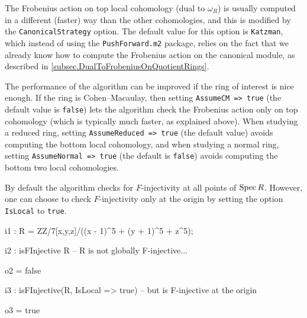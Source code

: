 \documentclass{amsart}
\begin{document}
The Frobenius action on top local cohomology (dual to $\omega_R$) is usually computed in a different (faster) way than the other cohomologies, and this is modified by the \texttt{CanonicalStrategy} option.
The default value for this option is \texttt{Katzman}, which instead of using the \texttt{PushForward.m2} package, relies on the fact that we already know how to compute the Frobenius action on the canonical module, as described in \autoref{subsec.DualToFrobeniusOnQuotientRings}.



The performance of the algorithm can be improved if the ring of interest is
nice enough. If the ring is Cohen--Macaulay, then setting \texttt{AssumeCM =>
true} (the default value is \texttt{false}) lets the algorithm check the Frobenius action only on top cohomology
(which is typically much faster, as explained above).
When studying a reduced ring,  setting \texttt{AssumeReduced => true} (the default value) avoids
computing the bottom local cohomology, and when studying a normal ring, setting
\texttt{AssumeNormal => true} (the default is \texttt{false}) avoids computing the bottom two local
cohomologies.

By default the algorithm checks for $F$-injectivity at all points of $\operatorname{{Spec}} R$.  However, one
can choose to check $F$-injectivity only at the origin by setting the
option \texttt{IsLocal} to  \texttt{true}.

\medskip
{\small{}
\begin{MyVerbatim}
i1 : R = ZZ/7[x,y,z]/((x - 1)^5 + (y + 1)^5 + z^5);

i2 : isFInjective R -- R is not globally F-injective...

o2 = false

i3 : isFInjective(R, IsLocal => true) -- but is F-injective at the origin

o3 = true
\end{MyVerbatim}
}\medskip
\end{document}
